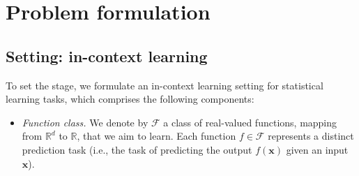 \documentclass[english]{article}
\begin{document}
\section{Problem formulation}
\label{sec:formulation}

\subsection{Setting: in-context learning} 
%
To set the stage, we formulate an in-context learning setting for statistical learning tasks, which comprises the following components: 
%
\begin{itemize}
    \item {\em Function class.} We denote by $\mathcal{F}$ a class of 
    real-valued functions, mapping from $\mathbb{R}^d$ to $\mathbb{R}$, that we aim to learn. Each function $f\in \mathcal{F}$ represents a distinct prediction task (i.e., the task of predicting the output $f(\bm{x})$ given an input $\bm{x}$). 


\end{itemize}
\end{document}
